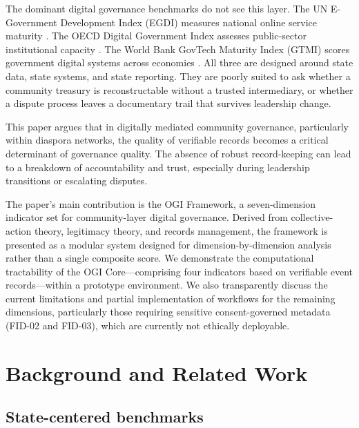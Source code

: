 \documentclass[sigconf,anonymous]{acmart}
\begin{document}
The dominant digital governance benchmarks do not see this layer. The UN E-Government Development Index (EGDI) measures national online service maturity \cite{un2022}. The OECD Digital Government Index assesses public-sector institutional capacity \cite{oecd2020}. The World Bank GovTech Maturity Index (GTMI) scores government digital systems across economies \cite{wb2021}. All three are designed around state data, state systems, and state reporting. They are poorly suited to ask whether a community treasury is reconstructable without a trusted intermediary, or whether a dispute process leaves a documentary trail that survives leadership change.

This paper argues that in digitally mediated community governance, particularly within diaspora networks, the quality of verifiable records becomes a critical determinant of governance quality. The absence of robust record-keeping can lead to a breakdown of accountability and trust, especially during leadership transitions or escalating disputes.

The paper’s main contribution is the OGI Framework, a seven-dimension indicator set for community-layer digital governance. Derived from collective-action theory, legitimacy theory, and records management, the framework is presented as a modular system designed for dimension-by-dimension analysis rather than a single composite score. We demonstrate the computational tractability of the OGI Core—comprising four indicators based on verifiable event records—within a prototype environment. We also transparently discuss the current limitations and partial implementation of workflows for the remaining dimensions, particularly those requiring sensitive consent-governed metadata (FID-02 and FID-03), which are currently not ethically deployable.

\section{Background and Related Work}

\subsection{State-centered benchmarks}
\end{document}
